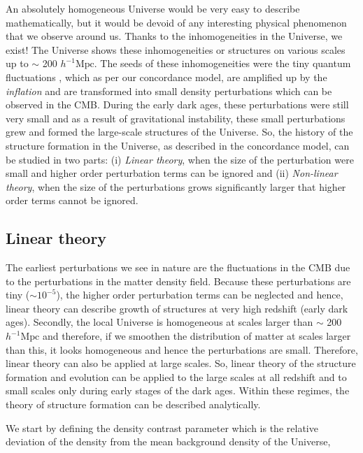 \documentclass[
  11pt,
  twoside,
  openright,
  titlepage,
  headings=optiontoheadandtoc
]{scrbook}
\begin{document}
An absolutely homogeneous Universe would be very easy to describe 
mathematically, but it would be devoid of any interesting physical 
phenomenon that we observe around us. Thanks to the inhomogeneities in the Universe, 
we exist! The Universe
shows these inhomogeneities or structures on various scales up to $\sim$ 
200 $h^{-1} \mathrm{Mpc}$. The seeds
of these inhomogeneities were the tiny quantum fluctuations \citep{1939Phy.....6..899S}
, which as per our concordance 
model, are amplified up by the {\it inflation} and are transformed into small density
perturbations which can be observed in the CMB. 
During the early dark ages, these perturbations were still very small and as 
a result of gravitational instability, these small perturbations 
grew and formed the large-scale structures of the Universe. 
So, the history of the  structure formation in the Universe, as described in the 
concordance model, can be studied in two parts: (i) {\it Linear theory}, when
the size of the perturbation were small and higher order perturbation terms 
can be ignored and 
(ii) {\it Non-linear theory}, when the size of the perturbations grows significantly
larger that higher order terms cannot be ignored.

\subsection{Linear theory}

The earliest perturbations we see in nature are the fluctuations in the
CMB due to the perturbations in the matter density
field. Because these perturbations are tiny ($\sim 10^{-5}$), 
the higher order perturbation
terms can be neglected and hence, linear theory can describe growth of structures
at very high redshift (early dark ages). 
Secondly, the local Universe is homogeneous at scales larger than
$\sim$ 200 $h^{-1} \mathrm{Mpc}$ and therefore, if we smoothen the distribution
of matter at scales larger than this, it looks homogeneous and hence the perturbations
are small. Therefore, linear theory can also be applied at large scales. 
So, linear theory of the structure formation and evolution can be applied
to the large scales at all redshift and to small scales only during
early stages of the dark ages. 
Within these regimes, the theory of structure formation can be
described analytically.

We start by defining the density contrast parameter which is the relative 
deviation of the density from the mean background density of the Universe,
\end{document}
